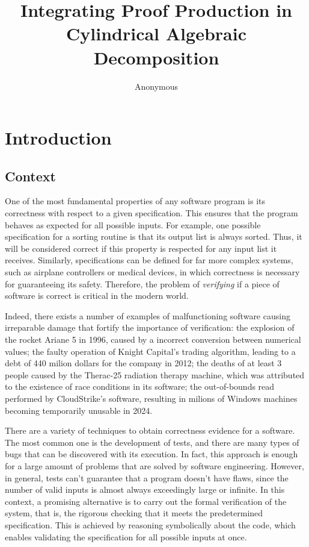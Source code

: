 \documentclass[a4paper, 12pt]{article}
\title{Integrating Proof Production in Cylindrical Algebraic Decomposition}
\author{Anonymous}
\date{}
\begin{document}
\maketitle

\vspace{-20pt}
\section{Introduction}
\subsection{Context}


\qquad One of the most fundamental properties of any software program is its correctness with respect
to a given specification. This ensures that the program behaves as expected for all possible inputs.
For example, one possible specification for a sorting routine is that its output list is always sorted.
Thus, it will be considered correct if this property is respected for any input list it receives.
Similarly, specifications can be defined for far more complex systems, such as airplane
controllers or medical devices, in which correctness is necessary for guaranteeing its safety.
Therefore, the problem of \textit{verifying} if a piece of software is correct is critical in the modern world.

Indeed, there exists a number of examples of malfunctioning software causing irreparable damage
that fortify the importance of verification: the explosion of the rocket Ariane 5 in 1996, caused by
a incorrect conversion between numerical values; the faulty operation of Knight Capital's trading algorithm,
leading to a debt of 440 milion dollars for the company in 2012; the deaths of at least 3 people caused by
the Therac-25 radiation therapy machine, which was attributed to the existence of race conditions in its
software; the out-of-bounds read performed by CloudStrike's software, resulting in milions of Windows machines
becoming temporarily unusable in 2024.


There are a variety of techniques to obtain correctness evidence for a
software. The most common one is the development of tests, and
there are many types of bugs that can be
discovered with its execution. In fact, this approach is enough for a large
amount of problems that are solved by software engineering.
However, in general, tests can't guarantee that a program doesn't have flaws, since the number of
valid inputs is almost always exceedingly large or infinite.
In this context, a promising alternative is to carry out the formal verification
of the system, that is, the rigorous checking that it meets the predetermined specification.
This is achieved by reasoning symbolically about the code, which enables validating the specification
for all possible inputs at once.
\end{document}
